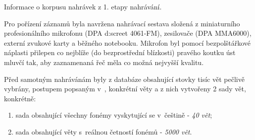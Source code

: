 \begin{table}[htpb]
  \centering
  \def\arraystretch{1.5}
  \caption{Informace o korpusu nahrávek z 1. etapy nahrávání.}
  \label{tab:construction:recording}
\end{table}


Pro pořízení záznamů byla navržena nahrávací sestava složená z miniaturního profesionálního mikrofonu (DPA d:screet 4061-FM), zesilovače (DPA MMA6000), externí zvukové karty a běžného notebooku. Mikrofon byl pomocí bezpolštářkové náplasti přilepen co nejblíže (do bezprostřední blízkosti) pravého koutku úst mluvčí tak, aby zaznamenaná řeč měla co možná nejvyšší kvalitu.


Před samotným nahrávánám byly z databáze obsahující stovky tisíc vět pečlivě vybrány, postupem popsaným v~\cite{Radova2000}, konkrétní věty a z nich vytvořeny 2 sady vět, konkrétně:

\begin{enumerate}
  \item sada obsahující všechny fonémy vyskytující se v~češtině - \textit{40 vět};
  \item sada obsahující věty s~reálnou četností fonémů - \textit{5000 vět}.
\end{enumerate}

